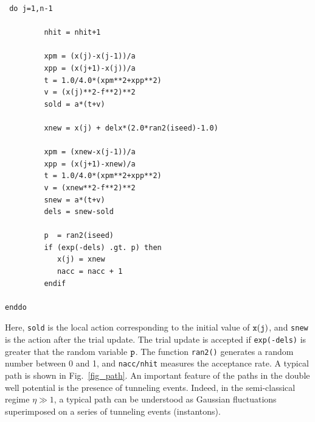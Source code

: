 \vspace*{0.3cm} 
\begin{lstlisting}
 do j=1,n-1
            
         nhit = nhit+1  
          
         xpm = (x(j)-x(j-1))/a
         xpp = (x(j+1)-x(j))/a
         t = 1.0/4.0*(xpm**2+xpp**2)
         v = (x(j)**2-f**2)**2
         sold = a*(t+v)

         xnew = x(j) + delx*(2.0*ran2(iseed)-1.0)
             
         xpm = (xnew-x(j-1))/a
         xpp = (x(j+1)-xnew)/a
         t = 1.0/4.0*(xpm**2+xpp**2)
         v = (xnew**2-f**2)**2
         snew = a*(t+v)
         dels = snew-sold           
                       
         p  = ran2(iseed)          
         if (exp(-dels) .gt. p) then
            x(j) = xnew
            nacc = nacc + 1
         endif
            
enddo
\end{lstlisting}

\vspace*{0.3cm} 
 Here, {\tt sold} is the local action corresponding to the initial
value of ${\tt x(j)}$, and {\tt snew} is the action after the trial
update. The trial update is accepted if {\tt exp(-dels)} is greater
that the random variable ${\tt p}$. The function {\tt ran2()} generates 
a random number between 0 and 1, and {\tt nacc/nhit} measures the 
acceptance rate. A typical path is shown in Fig.~\ref{fig_path}. An 
important feature of the paths in the double well potential is the 
presence of tunneling events. Indeed, in the semi-classical regime 
$\eta\gg 1$, a typical path can be understood as Gaussian fluctuations 
superimposed on a series of tunneling events (instantons). 

